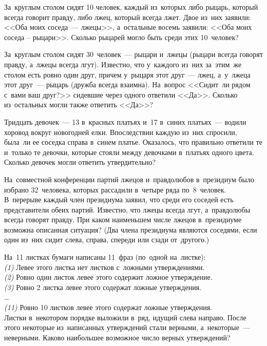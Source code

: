 \begin{problems}

\item
За~круглым столом сидят 10 человек, каждый из~которых либо рыцарь, который
всегда говорит правду, либо лжец, который всегда лжет.
Двое из~них заявили: <<Оба моих соседа~--- лжецы>>,
а~остальные восемь заявили: <<Оба моих соседа – рыцари>>.
Сколько рыцарей могло быть среди этих 10~человек?

\item
За~круглым столом сидят 30~человек~--- рыцари и~лжецы
(рыцари всегда говорят правду, а~лжецы всегда лгут).
Известно, что у~каждого из~них за~этим~же столом есть ровно один друг, причем
у~рыцаря этот друг~--- лжец, а~у~лжеца этот друг~--- рыцарь
(дружба всегда взаимна).
На~вопрос <<Сидит~ли рядом с~вами ваш друг?>> сидевшие через одного ответили
<<Да>>.
Сколько из~остальных могли также ответить <<Да>>?

\item
Тридцать девочек~--- 13 в~красных платьях и~17 в~синих платьях~--- водили
хоровод вокруг новогодней елки.
Впоследствии каждую из~них спросили, была~ли ее соседка справа в~синем платье.
Оказалось, что правильно ответили те и~только те девочки, которые стояли между
девочками в~платьях одного цвета.
Сколько девочек могли ответить утвердительно?

\item
На~совместной конференции партий лжецов и~правдолюбов в~президиум было избрано
32~человека, которых рассадили в~четыре ряда по~8~человек.
В~перерыве каждый член президиума заявил, что среди его соседей есть
представители обеих партий.
Известно, что лжецы всегда лгут, а~правдолюбы всегда говорят правду.
При каком наименьшем числе лжецов в~президиуме возможна описанная ситуация?
(Два члена президиума являются соседями, если один из~них сидит слева, справа,
спереди или сзади от~другого.)

\item
На~11 листках бумаги написаны 11~фраз (по~одной на~листке):
\\
\emph {(1)} Левее этого листка нет листков с~ложными утверждениями.
\\
\emph {(2)} Ровно один листок левее этого содержит ложное утверждение.
\\
\emph {(3)} Ровно 2 листка левее этого содержат ложные утверждения.
\\\ldots\\
\emph{(11)} Ровно 10 листков левее этого содержат ложные утверждения.
\\
Листки в~некотором порядке выложили в~ряд, идущий слева направо.
После этого некоторые из~написанных утверждений стали верными, а~некоторые~---
неверными.
Каково наибольшее возможное число верных утверждений?

\end{problems}

